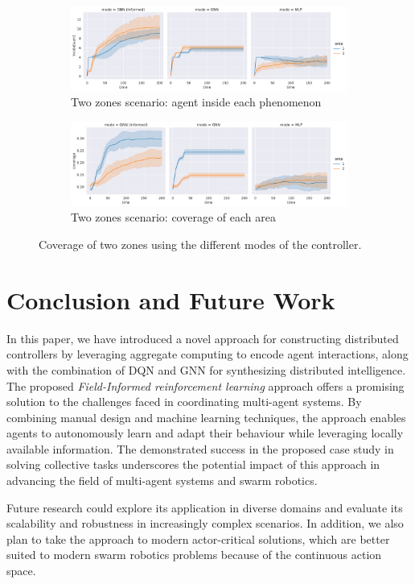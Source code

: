 \documentclass[conference]{IEEEtran}
\begin{document}
\begin{figure}
	\centering
  	\begin{subfigure}[b]{0.85\linewidth}
    \includegraphics[width=\linewidth]{imgs/inside-two-test}
    \caption{Two zones scenario: agent inside each phenomenon}
    \label{fig:inside-two-test}
  \end{subfigure}
  \begin{subfigure}[b]{0.85\linewidth}
    \includegraphics[width=\linewidth]{imgs/coverage-two-test}
    \caption{Two zones scenario: coverage of each area}
    \label{fig:coverage-two-test}
  \end{subfigure} 
  \caption{Coverage of two zones using the different modes of the controller.}
  \label{fig:resCoverage}
\end{figure}
 
\section{Conclusion and Future Work}
In this paper, 
 we have introduced a novel approach for constructing distributed controllers by leveraging aggregate computing to encode agent interactions, 
 along with the combination of \ac{DQN} and \ac{GNN} for synthesizing distributed intelligence.
The proposed \emph{Field-Informed reinforcement learning} approach offers a promising solution to the challenges faced in coordinating multi-agent systems. 
By combining manual design and machine learning techniques, 
 the approach enables agents to autonomously learn and adapt their behaviour while leveraging locally available information. 
%
The demonstrated success in the proposed case study in solving collective tasks underscores the potential impact of this approach in advancing the field of multi-agent systems and swarm robotics. 

Future research could explore its application in diverse domains and evaluate its scalability and robustness in increasingly complex scenarios. 
%
In addition, we also plan to take the approach to modern actor-critical solutions, which are better suited to modern swarm robotics problems because of the continuous action space.
\label{sec:conclusion}



\end{document}
